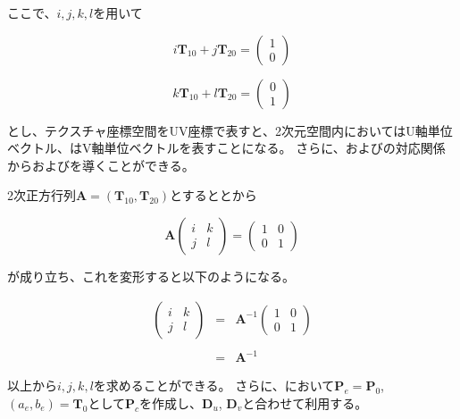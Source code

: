 \noindent
ここで、$i,j,k,l$を用いて

\begin{equation}
i\bm{T}_{10} + j\bm{T}_{20} = 
\begin{pmatrix}
1\\
0
\end{pmatrix}
\label{EUnit2u}
\end{equation}

\begin{equation}
k\bm{T}_{10} + l\bm{T}_{20} = 
\begin{pmatrix}
0\\
1
\end{pmatrix}
\label{EUnit2v}
\end{equation}

\noindent
とし、テクスチャ座標空間をUV座標で表すと、2次元空間内においてはU軸単位ベクトル、はV軸単位ベクトルを表すことになる。
さらに、およびの対応関係からおよびを導くことができる。

2次正方行列$\bm{A} = (\bm{T}_{10}, \bm{T}_{20})$とするととから

\begin{equation}
\bm{A} 
\begin{pmatrix}
i &k\\
j &l
\end{pmatrix}
=
\begin{pmatrix}
1 &0\\
0 &1
\end{pmatrix}
\label{EAx=I}
\end{equation}

\noindent
{}が成り立ち、これを変形すると以下のようになる。

\begin{eqnarray}
\label{EIjkl}
\begin{pmatrix}
i &k\\
j &l
\end{pmatrix}
&=& \bm{A}^{-1}
\begin{pmatrix}
1 &0\\
0 &1
\end{pmatrix}\nonumber\\
\nonumber\\
&=& \bm{A}^{-1}
\end{eqnarray}

\noindent
以上から$i,j,k,l$を求めることができる。
さらに、において$\bm{P}_e = \bm{P}_0$, $(a_e, b_e) = \bm{T}_0$として$\bm{P}_c$を作成し、$\bm{D}_u$, $\bm{D}_v$と合わせて利用する。


